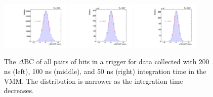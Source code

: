 \begin{figure}[!htpb]
  \begin{center}
    \includegraphics[width=0.3\textwidth]{figures/gbtanalysis3530/artrpairs_lin.pdf}
    \includegraphics[width=0.3\textwidth]{figures/gbtanalysis3527/artrpairs_lin.pdf}
    \includegraphics[width=0.3\textwidth]{figures/gbtanalysis3528/artrpairs_lin.pdf}
  \end{center}
  \vspace{-10pt}
  \caption{The $\Delta\text{BC}$ of all pairs of hits in a trigger for data collected with 200 ns (left), 100 ns (middle), and 50 ns (right) integration time in the VMM. The distribution is narrower as the integration time decreases.}
  \label{fig:integ_pairs}
\end{figure}

